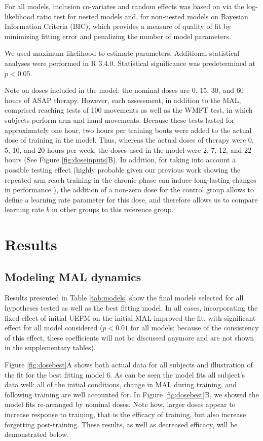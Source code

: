 For all models, inclusion co-variates and random effects was based on via the log-likelihood ratio test for nested models and, for non-nested models on Bayesian Information Criteria (BIC), which provides a measure of quality of fit by minimizing fitting error and penalizing the number of model parameters. 

We used maximum likelihood to estimate parameters. 
Additional statistical analyses were performed in \textsf{R 3.4.0}. 
Statistical significance was predetermined at $ p < 0.05 $. 

Note on doses included in the model: the nominal doses are 0, 15, 30, and 60 hours of ASAP therapy. 
However, each assessment, in addition to the MAL, comprised reaching tests of 100 movements as well as the WMFT test, in which subjects perform arm and hand movements. 
Because these tests lasted for approximately one hour, two hours per training bouts were added to the actual dose of training in the model.
Thus, whereas the actual doses of therapy were 0, 5, 10, and 20 hours per week, the doses used in the model were 2, 7, 12, and 22 hours (See Figure \ref{fig:doseinputs}B). 
In addition, for taking into account a possible testing effect (highly probable given our previous work showing the repeated arm reach training in the chronic phase can induce long-lasting changes in performance \cite{Park2016}), the addition of a non-zero dose for the control group allows to define a learning rate parameter for this dose, and therefore allows us to compare learning rate $ b $ in other groups to this reference group.


\section{Results}


\subsection{Modeling MAL dynamics}
Results presented in Table \ref{tab:models} show the final models selected for all hypotheses tested as well as the best fitting model. 
In all cases, incorporating the fixed effect of initial UEFM on the initial MAL improved the fit, with significant effect for all model considered ($ p < 0.01 $ for all models; because of the consistency of this effect, these coefficients will not be discussed anymore and are not shown in the supplementary tables).

Figure \ref{fig:dosebest}A shows both actual data for all subjects and illustration of the fit for the best fitting model 6. 
As can be seen the model fits all subject’s data well: all of the initial conditions, change in MAL during training, and following training are well accounted for. 
In Figure \ref{fig:dosebest}B, we showed the model fits re-arranged by nominal doses. 
Note how, larger doses appear to increase response to training, that is the efficacy of training, but also increase forgetting post-training. 
These results, as well as decreased efficacy, will be demonstrated below.

